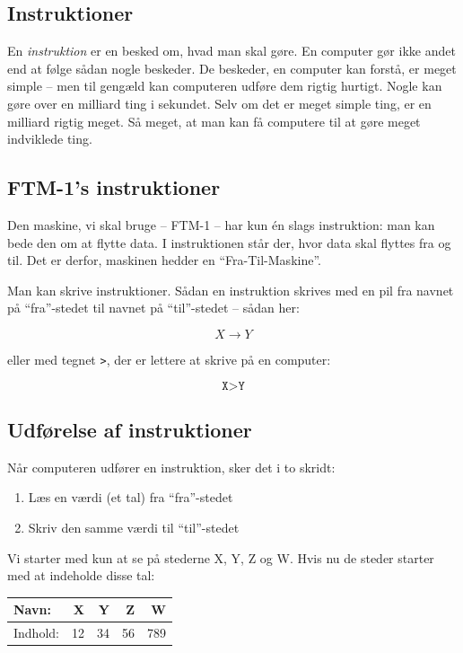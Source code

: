 \documentclass[a4paper]{article}
\begin{document}
\subsection*{Instruktioner}

En \emph{instruktion} er en besked om, hvad man skal gøre.
En computer gør ikke andet end at følge sådan nogle beskeder.
De beskeder, en computer kan forstå, er meget simple -- men til
gengæld kan computeren udføre dem rigtig hurtigt. Nogle kan gøre over
en milliard ting i sekundet. Selv om det er meget simple ting, er en
milliard rigtig meget. Så meget, at man kan få computere til at gøre
meget indviklede ting.

\subsection*{FTM-1's instruktioner}
Den maskine, vi skal bruge -- FTM-1 -- har kun én slags instruktion:
man kan bede den om at flytte data.
I instruktionen står der, hvor data skal flyttes fra og til. Det er
derfor, maskinen hedder en ``Fra-Til-Maskine''.

Man kan skrive instruktioner.
Sådan en instruktion skrives med en pil fra navnet på ``fra''-stedet til navnet på ``til''-stedet -- sådan her:

$$X \to Y$$

\noindent
eller med tegnet \texttt{>}, der er lettere at skrive på en computer:

$$\texttt{X>Y}$$

\subsection*{Udførelse af  instruktioner}
Når computeren udfører en instruktion, sker det i to skridt:
\begin{enumerate}\setlength\itemsep{0pt}
\item Læs en værdi (et tal) fra ``fra''-stedet
\item Skriv den samme værdi til ``til''-stedet
\end{enumerate}

Vi starter med kun at se på stederne X, Y, Z og W.
Hvis nu de steder starter med at indeholde disse tal:

\begin{center}
\begin{tabular}{lrrrr}
Navn: & X & Y & Z & W\\
\hline
Indhold: & 12 & 34 & 56 & 789\\
\end{tabular}
\end{center}
\end{document}
